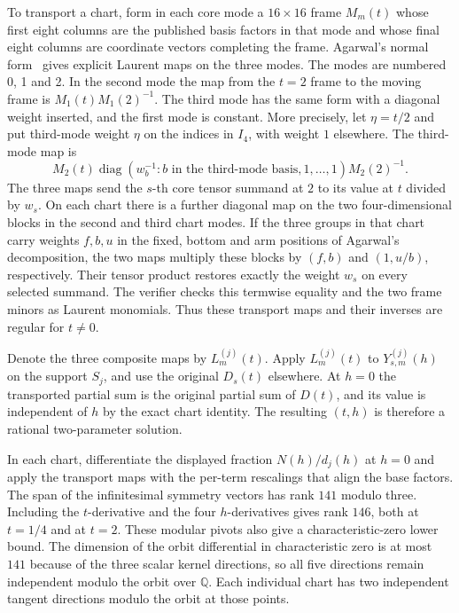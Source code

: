 \documentclass[11pt,reqno]{amsart}
\newcommand{\Q}{\mathbb Q}
\begin{document}
To transport a chart, form in each core mode a \(16\times16\) frame \(M_m(t)\) whose first eight columns are the published basis factors in that mode and whose final eight columns are coordinate vectors completing the frame. Agarwal's normal form~\cite{agarwal} gives explicit Laurent maps on the three modes. The modes are numbered 0, 1 and 2. In the second mode the map from the \(t=2\) frame to the moving frame is \(M_1(t)M_1(2)^{-1}\). The third mode has the same form with a diagonal weight inserted, and the first mode is constant. More precisely, let \(\eta=t/2\) and put third-mode weight \(\eta\) on the indices in \(I_4\), with weight \(1\) elsewhere. The third-mode map is
\[
 M_2(t)\operatorname{diag}(w_b^{-1}:b\text{ in the third-mode basis},1,\ldots,1)M_2(2)^{-1}.
\]
The three maps send the \(s\)-th core tensor summand at \(2\) to its value at \(t\) divided by \(w_s\). On each chart there is a further diagonal map on the two four-dimensional blocks in the second and third chart modes. If the three groups in that chart carry weights \(f,b,u\) in the fixed, bottom and arm positions of Agarwal's decomposition, the two maps multiply these blocks by \((f,b)\) and \((1,u/b)\), respectively. Their tensor product restores exactly the weight \(w_s\) on every selected summand. The verifier checks this termwise equality and the two frame minors as Laurent monomials. Thus these transport maps and their inverses are regular for \(t\ne0\).

Denote the three composite maps by \(L_m^{(j)}(t)\). Apply \(L_m^{(j)}(t)\) to \(Y_{s,m}^{(j)}(h)\) on the support \(S_j\), and use the original \(D_s(t)\) elsewhere. At \(h=0\) the transported partial sum is the original partial sum of \(D(t)\), and its value is independent of \(h\) by the exact chart identity. The resulting \((t,h)\) is therefore a rational two-parameter solution.

In each chart, differentiate the displayed fraction \(N(h)/d_j(h)\) at \(h=0\) and apply the transport maps with the per-term rescalings that align the base factors. The span of the infinitesimal symmetry vectors has rank \(141\) modulo three. Including the \(t\)-derivative and the four \(h\)-derivatives gives rank \(146\), both at \(t=1/4\) and at \(t=2\). These modular pivots also give a characteristic-zero lower bound. The dimension of the orbit differential in characteristic zero is at most \(141\) because of the three scalar kernel directions, so all five directions remain independent modulo the orbit over \(\Q\). Each individual chart has two independent tangent directions modulo the orbit at those points.
\end{document}
